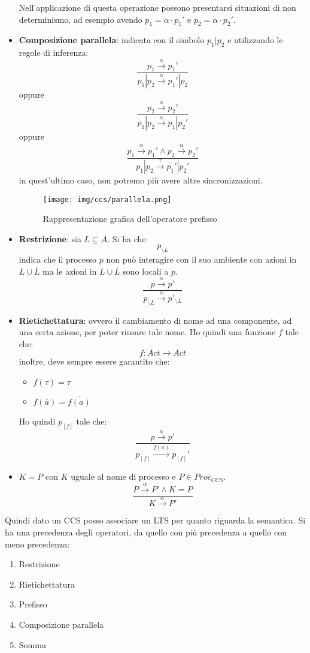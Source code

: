 \begin{itemize}
    Nell'applicazione di questa operazione possono presentarsi situazioni di non determinismo, ad esempio avendo $p_1 = \alpha \cdot p_1'$ e $p_2 = \alpha \cdot p_2'$.
    \item \textbf{Composizione parallela}: indicata con il simbolo $p_1 | p_2$ e utilizzando le regole di inferenza: $$\frac{p_1 \xrightarrow{\alpha} p_1'}{p_1 | p_2 \xrightarrow{\alpha} p_1' | p_2}$$ oppure $$\frac{p_2 \xrightarrow{\alpha} p_2'}{p_1 | p_2 \xrightarrow{\alpha} p_1 | p_2'}$$ oppure $$\frac{p_1 \xrightarrow{\alpha} p_1' \land p_2 \xrightarrow{\overline{\alpha}} p_2'}{p_1 | p_2 \xrightarrow{\tau} p_1' | p_2'}$$ in quest'ultimo caso, non potremo più avere altre sincronizzazioni.
    \begin{figure}[!ht]
        \centering
        \texttt{[image: img/ccs/parallela.png]}
        \caption{Rappresentazione grafica dell'operatore prefisso}
    \end{figure}
    \item \textbf{Restrizione}: sia $L \subseteq A$. Si ha che: $$p_{\setminus L}$$ indica che il processo $p$ non può interagire con il suo ambiente con azioni in $L \cup \overline{L}$ ma le azioni in $L \cup \overline{L}$ sono locali a $p$. $$\frac{p \xrightarrow{\alpha} p'}{ p_{\setminus L} \xrightarrow{\alpha} p'_{\setminus L}}$$
    \item \textbf{Rietichettatura}: ovvero il cambiamento di nome ad una componente, ad una certa azione, per poter riusare tale nome. Ho quindi una funzione $f$ tale che:
    \begin{equation}
        f: Act \to Act
    \end{equation}
    inoltre, deve sempre essere garantito che:
    \begin{itemize}
        \item $f(\tau) = \tau$
        \item $f(\overline{a}) = \overline{f(a)}$
    \end{itemize}

    Ho quindi $p_{[f]}$ tale che: $$\frac{p \xrightarrow{\alpha} p'}{p_{[f]} \xrightarrow{f(a)} p_{[f]}'}$$
    \item $K = P$ con $K$ uguale al nome di processo e $P \in Proc_{CCS}$. $$\frac{P \xrightarrow{\alpha} P' \land K = P}{K \xrightarrow{\alpha} P'}$$  
\end{itemize}
Quindi dato un CCS posso associare un LTS per quanto riguarda la semantica. Si ha una precedenza degli operatori, da quello con più precedenza a quello con meno precedenza:
\begin{enumerate}
    \item Restrizione
    \item Rietichettatura
    \item Prefisso
    \item Composizione parallela
    \item Somma
\end{enumerate}
